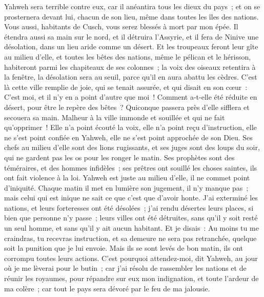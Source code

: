 \begin{multicols}{2}
Yahweh sera terrible contre eux, car il anéantira tous les dieux du pays~; et on se prosternera devant lui, chacun de son lieu, même dans toutes les îles des nations.
Vous aussi, habitants de Cusch, vous serez blessés à mort par mon épée.
Il étendra aussi sa main sur le nord, et il détruira l'Assyrie, et il fera de Ninive une désolation, dans un lieu aride comme un désert.
Et les troupeaux feront leur gîte au milieu d'elle, et toutes les bêtes des nations, même le pélican et le hérisson, habiteront parmi les chapiteaux de ses colonnes~; la voix des oiseaux retentira à la fenêtre, la désolation sera au seuil, parce qu'il en aura abattu les cèdres.
C'est là cette ville remplie de joie, qui se tenait assurée, et qui disait en son cœur~: C'est moi, et il n'y en a point d'autre que moi~! Comment a-t-elle été réduite en désert, pour être le repère des bêtes~? Quiconque passera près d'elle sifflera et secouera sa main.
\VerseOne{}Malheur à la ville immonde et souillée et qui ne fait qu'opprimer~!
Elle n'a point écouté la voix, elle n'a point reçu d'instruction, elle ne s'est point confiée en Yahweh, elle ne s'est point approchée de son Dieu.
Ses chefs au milieu d'elle sont des lions rugissants, et ses juges sont des loups du soir, qui ne gardent pas les os pour les ronger le matin.
Ses prophètes sont des téméraires, et des hommes infidèles~; ses prêtres ont souillé les choses saintes, ils ont fait violence à la loi.
Yahweh est juste au milieu d'elle, il ne commet point d'iniquité. Chaque matin il met en lumière son jugement, il n'y manque pas~; mais celui qui est inique ne sait ce que c'est que d'avoir honte.
J'ai exterminé les nations, et leurs forteresses ont été désolées~; j'ai rendu désertes leurs places, si bien que personne n'y passe~; leurs villes ont été détruites, sans qu'il y soit resté un seul homme, et sans qu'il y ait aucun habitant.
Et je disais~: Au moins tu me craindras, tu recevras instruction, et sa demeure ne sera pas retranchée, quelque soit la punition que je lui envoie. Mais ils se sont levés de bon matin, ils ont corrompu toutes leurs actions.
C'est pourquoi attendez-moi, dit Yahweh, au jour où je me lèverai pour le butin~; car j'ai résolu de rassembler les nations et de réunir les royaumes, pour répandre sur eux mon indignation, et toute l'ardeur de ma colère~; car tout le pays sera dévoré par le feu de ma jalousie.

\end{multicols}
